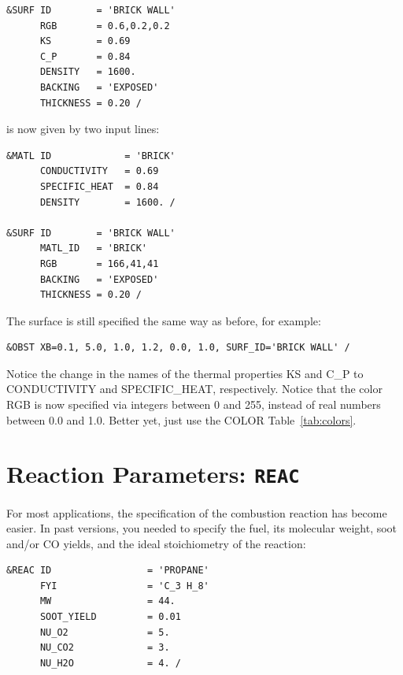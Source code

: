 \documentclass[11pt]{book}
\begin{document}
\footnotesize
\begin{verbatim}
&SURF ID        = 'BRICK WALL'
      RGB       = 0.6,0.2,0.2
      KS        = 0.69
      C_P       = 0.84
      DENSITY   = 1600.
      BACKING   = 'EXPOSED'
      THICKNESS = 0.20 /
\end{verbatim}
\normalsize

\noindent
is now given by two input lines:

\footnotesize
\begin{verbatim}
&MATL ID             = 'BRICK'
      CONDUCTIVITY   = 0.69
      SPECIFIC_HEAT  = 0.84
      DENSITY        = 1600. /

&SURF ID        = 'BRICK WALL'
      MATL_ID   = 'BRICK'
      RGB       = 166,41,41
      BACKING   = 'EXPOSED'
      THICKNESS = 0.20 /
\end{verbatim}
\normalsize

\noindent
The surface is still specified the same way as before, for example:

\footnotesize
\begin{verbatim}
&OBST XB=0.1, 5.0, 1.0, 1.2, 0.0, 1.0, SURF_ID='BRICK WALL' /
\end{verbatim}
\normalsize

\noindent
Notice the change in the names of the thermal properties {\ct KS} and {\ct C\_P} to {\ct CONDUCTIVITY} and
{\ct SPECIFIC\_HEAT}, respectively. Notice that the color {\ct RGB} is now specified via integers between 0 and 255, instead of
real numbers between 0.0 and 1.0. Better yet, just use the {\ct COLOR} Table~\ref{tab:colors}.



\section{Reaction Parameters: \texorpdfstring{{\tt REAC}}{REAC}}

For most applications, the specification of the combustion reaction has become easier. In past versions, you needed to specify the fuel, its molecular weight, soot and/or CO yields, and the ideal stoichiometry of the reaction:

\footnotesize
\begin{verbatim}
&REAC ID                 = 'PROPANE'
      FYI                = 'C_3 H_8'
      MW                 = 44.
      SOOT_YIELD         = 0.01
      NU_O2              = 5.
      NU_CO2             = 3.
      NU_H2O             = 4. /
\end{verbatim}
\normalsize
\end{document}
